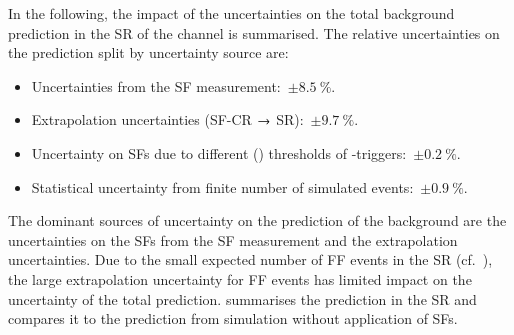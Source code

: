 In the following, the impact of the uncertainties on the total \ttbarFakes
background prediction in the SR of the \hadhad channel is summarised. The
relative uncertainties on the prediction split by uncertainty source are:
\begin{itemize}

\item Uncertainties from the SF measurement:~$\pm \SI{8.5}{\percent}$.

\item Extrapolation uncertainties (SF-CR $\rightarrow$ \hadhad
  SR):~$\pm \SI{9.7}{\percent}$.

\item Uncertainty on SFs due to different \pT (\ET) thresholds of
  \tauhadvis-triggers:~$\pm \SI{0.2}{\percent}$.

\item Statistical uncertainty from finite number of simulated
  events:~$\pm \SI{0.9}{\percent}$.

\end{itemize}
The dominant sources of uncertainty on the prediction of the \ttbarFakes
background are the uncertainties on the SFs from the SF measurement and the
extrapolation uncertainties. Due to the small expected number of FF events in
the \hadhad SR (cf.~), the large extrapolation
uncertainty for FF events has limited impact on the uncertainty of the total
\ttbarFakes prediction.
 summarises the \ttbarFakes prediction in the \hadhad
SR and compares it to the prediction from simulation without application of
\faketauhadvis SFs.


